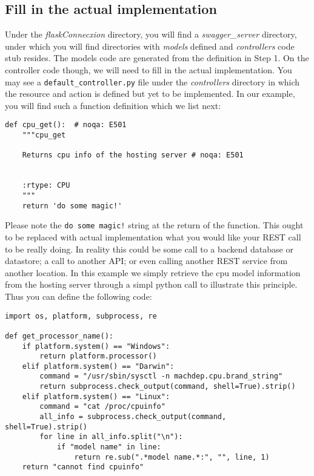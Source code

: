 \subsection{Fill in the actual
implementation}\label{s:swagger-codegen-implementation}

Under the \emph{flaskConnecxion} directory, you will find a
\emph{swagger\_server} directory, under which you will find directories
with \emph{models} defined and \emph{controllers} code stub resides. The
models code are generated from the definition in Step 1. On the
controller code though, we will need to fill in the actual
implementation. You may see a \texttt{default\_controller.py} file under
the \emph{controllers} directory in which the resource and action is
defined but yet to be implemented. In our example, you will find such a
function definition which we list next:

\begin{lstlisting}
def cpu_get():  # noqa: E501
    """cpu_get

    Returns cpu info of the hosting server # noqa: E501


    :rtype: CPU
    """
    return 'do some magic!'
\end{lstlisting}

Please note the \texttt{do\ some\ magic!} string at the return of the
function. This ought to be replaced with actual implementation what you
would like your REST call to be really doing. In reality this could be
some call to a backend database or datastore; a call to another API; or
even calling another REST service from another location. In this example
we simply retrieve the cpu model information from the hosting server
through a simpl python call to illustrate this principle. Thus you can
define the following code:

\begin{lstlisting}
import os, platform, subprocess, re

def get_processor_name():
    if platform.system() == "Windows":
        return platform.processor()
    elif platform.system() == "Darwin":
        command = "/usr/sbin/sysctl -n machdep.cpu.brand_string"
        return subprocess.check_output(command, shell=True).strip()
    elif platform.system() == "Linux":
        command = "cat /proc/cpuinfo"
        all_info = subprocess.check_output(command, shell=True).strip()
        for line in all_info.split("\n"):
            if "model name" in line:
                return re.sub(".*model name.*:", "", line, 1)
    return "cannot find cpuinfo"
\end{lstlisting}

